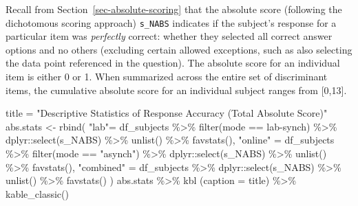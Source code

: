 \documentclass[
  letterpaper,
  DIV=11,
  numbers=noendperiod]{scrreprt}
\newenvironment{Shaded}{\begin{snugshade}}{\end{snugshade}}
\newcommand{\AttributeTok}[1]{\textcolor[rgb]{0.40,0.45,0.13}{#1}}
\newcommand{\FunctionTok}[1]{\textcolor[rgb]{0.28,0.35,0.67}{#1}}
\newcommand{\NormalTok}[1]{\textcolor[rgb]{0.00,0.23,0.31}{#1}}
\newcommand{\OtherTok}[1]{\textcolor[rgb]{0.00,0.23,0.31}{#1}}
\newcommand{\SpecialCharTok}[1]{\textcolor[rgb]{0.37,0.37,0.37}{#1}}
\newcommand{\StringTok}[1]{\textcolor[rgb]{0.13,0.47,0.30}{#1}}
\begin{document}
Recall from Section~\ref{sec-absolute-scoring} that the absolute score
(following the dichotomous scoring approach) \texttt{s\_NABS} indicates
if the subject's response for a particular item was \emph{perfectly}
correct: whether they selected all correct answer options and no others
(excluding certain allowed exceptions, such as also selecting the data
point referenced in the question). The absolute score for an individual
item is either 0 or 1. When summarized across the entire set of
discriminant items, the cumulative absolute score for an individual
subject ranges from {[}0,13{]}.

\begin{Shaded}
\begin{Highlighting}[]
\NormalTok{title }\OtherTok{=} \StringTok{"Descriptive Statistics of Response Accuracy (Total Absolute Score)"}
\NormalTok{abs.stats }\OtherTok{\textless{}{-}} \FunctionTok{rbind}\NormalTok{(}
  \StringTok{"lab"}\OtherTok{=}\NormalTok{ df\_subjects }\SpecialCharTok{\%\textgreater{}\%} \FunctionTok{filter}\NormalTok{(mode }\SpecialCharTok{==} \StringTok{\textquotesingle{}lab{-}synch\textquotesingle{}}\NormalTok{) }\SpecialCharTok{\%\textgreater{}\%}\NormalTok{ dplyr}\SpecialCharTok{::}\FunctionTok{select}\NormalTok{(s\_NABS) }\SpecialCharTok{\%\textgreater{}\%} \FunctionTok{unlist}\NormalTok{() }\SpecialCharTok{\%\textgreater{}\%} \FunctionTok{favstats}\NormalTok{(),}
  \StringTok{"online"} \OtherTok{=}\NormalTok{ df\_subjects }\SpecialCharTok{\%\textgreater{}\%} \FunctionTok{filter}\NormalTok{(mode }\SpecialCharTok{==} \StringTok{"asynch"}\NormalTok{) }\SpecialCharTok{\%\textgreater{}\%}\NormalTok{ dplyr}\SpecialCharTok{::}\FunctionTok{select}\NormalTok{(s\_NABS) }\SpecialCharTok{\%\textgreater{}\%} \FunctionTok{unlist}\NormalTok{() }\SpecialCharTok{\%\textgreater{}\%} \FunctionTok{favstats}\NormalTok{(),}
  \StringTok{"combined"} \OtherTok{=}\NormalTok{ df\_subjects }\SpecialCharTok{\%\textgreater{}\%}\NormalTok{ dplyr}\SpecialCharTok{::}\FunctionTok{select}\NormalTok{(s\_NABS) }\SpecialCharTok{\%\textgreater{}\%} \FunctionTok{unlist}\NormalTok{() }\SpecialCharTok{\%\textgreater{}\%} \FunctionTok{favstats}\NormalTok{()}
\NormalTok{) }
\NormalTok{abs.stats }\SpecialCharTok{\%\textgreater{}\%} \FunctionTok{kbl}\NormalTok{ (}\AttributeTok{caption =}\NormalTok{ title) }\SpecialCharTok{\%\textgreater{}\%} \FunctionTok{kable\_classic}\NormalTok{()}
\end{Highlighting}
\end{Shaded}
\end{document}
